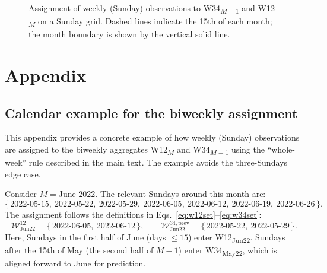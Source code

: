 \documentclass[12pt,a4paper]{article}
\begin{document}
\begin{figure}[H]
\centering
{}
\caption{Assignment of weekly (Sunday) observations to W34\textsubscript{$M-1$} and W12\textsubscript{$M$} on a Sunday grid. Dashed lines indicate the 15th of each month; the month boundary is shown by the vertical solid line.}
\label{fig:timing-schematic}
\end{figure}

\section{Appendix}
\subsection{Calendar example for the biweekly assignment}
\label{app:biweekly-example}

This appendix provides a concrete example of how weekly (Sunday) observations are assigned to the biweekly aggregates W12\textsubscript{$M$} and W34\textsubscript{$M-1$} using the ``whole-week'' rule described in the main text. The example avoids the three-Sundays edge case.

Consider $M=\text{June 2022}$. The relevant Sundays around this month are:
\[
\{\,\text{2022-05-15},\ \text{2022-05-22},\ \text{2022-05-29},\ \text{2022-06-05},\ \text{2022-06-12},\ \text{2022-06-19},\ \text{2022-06-26}\,\}.
\]
The assignment follows the definitions in Eqs.~\eqref{eq:w12set}--\eqref{eq:w34set}:
\[
\mathcal{W}^{12}_{\text{Jun22}}
=
\{\,\text{2022-06-05},\ \text{2022-06-12}\,\},
\qquad
\mathcal{W}^{34,\text{prev}}_{\text{Jun22}}
=
\{\,\text{2022-05-22},\ \text{2022-05-29}\,\}.
\]
Here, Sundays in the first half of June (days $\le 15$) enter W12\textsubscript{Jun22}. Sundays after the 15th of May (the second half of $M{-}1$) enter W34\textsubscript{May22}, which is aligned forward to June for prediction.
\end{document}
